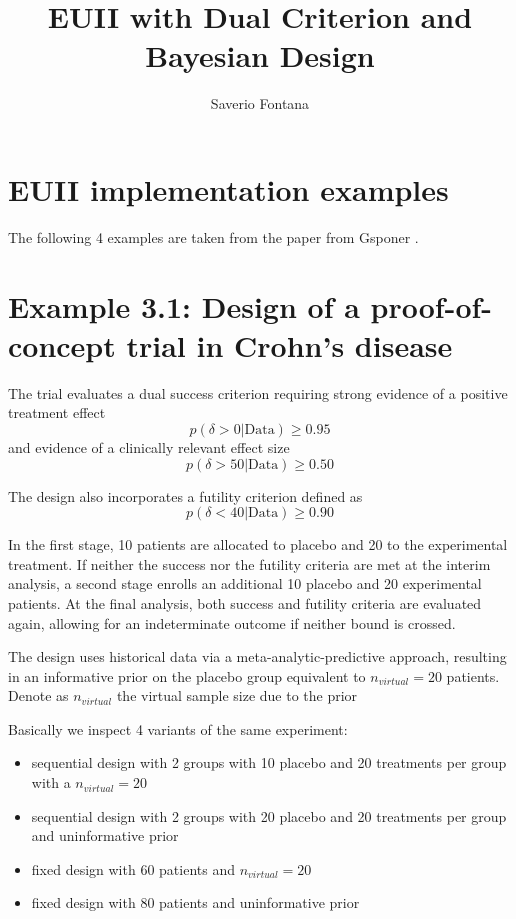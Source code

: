 \documentclass{article}\usepackage[]{graphicx}\usepackage[]{xcolor}
\title{EUII with Dual Criterion and Bayesian Design}
\author{Saverio Fontana}
\begin{document}
\maketitle




\section{EUII implementation examples}
The following 4 examples are taken from the paper from Gsponer \cite{gsponer2014bayesian}.

\section{Example 3.1: Design of a proof-of-concept trial in Crohn’s disease}


The trial evaluates a dual success criterion requiring strong evidence of a positive treatment effect $$p(\delta > 0 | \text{Data}) \ge 0.95$$
and evidence of a clinically relevant effect size $$p(\delta > 50 | \text{Data}) \ge 0.50$$

The design also incorporates a futility criterion defined as 
$$p(\delta < 40 | \text{Data}) \ge 0.90$$

In the first stage, 10 patients are allocated to placebo and 20 to the experimental treatment. If neither the success nor the futility criteria are met 
at the interim analysis, a second stage enrolls an additional 10 placebo and 20 experimental patients. At the final analysis, both success and futility 
criteria are evaluated again, allowing for an indeterminate outcome if neither bound is crossed.

The design uses historical data via a meta-analytic-predictive approach, resulting in an informative prior on the placebo group equivalent to 
$n_{virtual} = 20$ patients. 
Denote as $n_{virtual}$ the virtual sample size due to the prior

Basically we inspect 4 variants of the same experiment:
\begin{itemize}
  \item sequential design with 2 groups with 10 placebo and 20 treatments per group with a $n_{virtual} = 20$
  \item sequential design with 2 groups with 20 placebo and 20 treatments per group and uninformative prior
  \item fixed design with 60 patients and $n_{virtual} = 20$
  \item fixed design with 80 patients and uninformative prior
\end{itemize}
\end{document}
